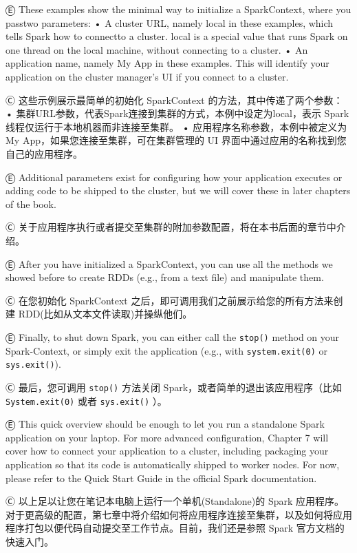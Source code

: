 {Ⓔ \textcolor{etc}{These examples show the minimal way to initialize a SparkContext, where you passtwo parameters: • A cluster URL, namely local in these examples, which tells Spark how to connectto a cluster. local is a special value that runs Spark on one thread on the local machine, without connecting to a cluster. • An application name, namely My App in these examples. This will identify your application on the cluster manager's UI if you connect to a cluster.}

Ⓒ 这些示例展示最简单的初始化 SparkContext 的方法，其中传递了两个参数： •
集群URL参数，代表Spark连接到集群的方式，本例中设定为local，表示 Spark
线程仅运行于本地机器而非连接至集群。 • 应用程序名称参数，本例中被定义为
My App，如果您连接至集群，可在集群管理的 UI
界面中通过应用的名称找到您自己的应用程序。

Ⓔ \textcolor{etc}{Additional parameters exist for configuring how your application executes or adding code to be shipped to the cluster, but we will cover these in later chapters of the book.}

Ⓒ
关于应用程序执行或者提交至集群的附加参数配置，将在本书后面的章节中介绍。

Ⓔ \textcolor{etc}{After you have initialized a SparkContext, you can use all the methods we showed before to create RDDs (e.g., from a text file) and manipulate them.}

Ⓒ 在您初始化 SparkContext 之后，即可调用我们之前展示给您的所有方法来创建
RDD(比如从文本文件读取)并操纵他们。

Ⓔ \textcolor{etc}{Finally, to shut down Spark, you can either call the \lstinline{stop()} method on your Spark-Context, or simply exit the application (e.g., with \lstinline{system.exit(0)} or \lstinline{sys.exit()}).}

Ⓒ 最后，您可调用 \lstinline{stop()} 方法关闭 Spark，或者简单的退出该应用程序（比如\lstinline{System.exit(0)} 或者 \lstinline{sys.exit()} ）。

Ⓔ \textcolor{etc}{This quick overview should be enough to let you run a standalone Spark application on your laptop. For more advanced configuration, Chapter 7 will cover how to connect your application to a cluster, including packaging your application so that its code is automatically shipped to worker nodes. For now, please refer to the Quick Start Guide in the official Spark documentation.}

Ⓒ 以上足以让您在笔记本电脑上运行一个单机(Standalone)的 Spark
应用程序。对于更高级的配置，第七章中将介绍如何将应用程序连接至集群，以及如何将应用程序打包以便代码自动提交至工作节点。目前，我们还是参照
Spark 官方文档的快速入门。

}
